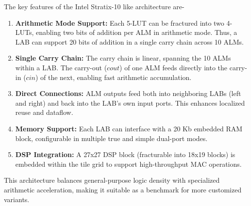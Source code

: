 The key features of the Intel Stratix-10 like architecture are-
\begin{enumerate}
	\item \textbf{Arithmetic Mode Support:} Each 5-LUT can be fractured into two 4-LUTs, enabling two bits of addition per ALM in arithmetic mode. Thus, a LAB can support 20 bits of addition in a single carry chain across 10 ALMs.
	\item \textbf{Single Carry Chain:} The carry chain is linear, spanning the 10 ALMs within a LAB. The carry-out ($cout$) of one ALM feeds directly into the carry-in ($cin$) of the next, enabling fast arithmetic accumulation. 
	\item \textbf{Direct Connections:} ALM outputs feed both into neighboring LABs (left and right) and back into the LAB’s own input ports. This enhances localized reuse and dataflow.
	\item \textbf{Memory Support:} Each LAB can interface with a 20 Kb embedded RAM block, configurable in multiple true and simple dual-port modes.
	\item \textbf{DSP Integration:} A 27x27 DSP block (fracturable into 18x19 blocks) is embedded within the tile grid to support high-throughput MAC operations.
\end{enumerate}

This architecture balances general-purpose logic density with specialized arithmetic acceleration, making it suitable as a benchmark for more customized variants.

